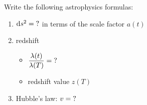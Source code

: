 

\vspace*{\fill}
\centering

Write the following astrophysics formulas:
\begin{enumerate}
    \item $\dd{s^2} = {\rm ?}$ in terms of the scale factor $a(t)$
    \item redshift
        \begin{itemize}
            \item $\displaystyle \frac{\lambda(t)}{\lambda(T)} = {\rm ?}$ 
            \item redshift value $z(T)$
        \end{itemize}
    \item Hubble's law: $v = {\rm ?}$
\end{enumerate}

\centering
\vspace*{\fill}

